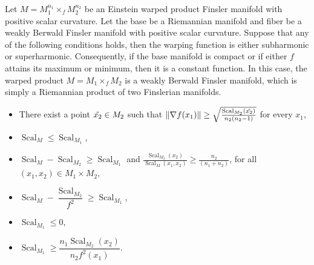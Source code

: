 \documentclass[10pt,a4paper]{amsart}
\begin{document}
\begin{theorem}\label{thm4.2}
	Let $M=M_1^{n_1}\times_{f} M_2^{n_2}$ be an Einstein warped product Finsler manifold with 
 positive scalar curvature. 
 Let the base be a Riemannian manifold and fiber be  a weakly Berwald Finsler manifold with 
positive scalar curvature.
Suppose that 
  any of  the following conditions holds, then the 
  warping function is either subharmonic or superharmonic. Consequently, if the base manifold is compact 
  or if either $f$ attains its maximum or minimum, then
  it is a constant function. In this case,
   the warped product $M=M_1\times_f M_2$ is a weakly Berwald Finsler manifold, which is  simply a Riemannian product of two Finslerian manifolds.
	\begin{itemize}
		\item[\emph{(a)}] There exist a point $\Tilde{x_2}\in M_2$ such that 
  $\|\nabla f(x_1)\|\geq \sqrt{\frac{\operatorname{Scal}_{M_2}(\Tilde{x_2})}{n_2(n_2-1)}}$ for every $x_1$,
		
		\item[\emph{(b)}] $\operatorname{Scal}_M\leq \operatorname{Scal}_{M_1}$,
		
		\item[\emph{(c)}] $\operatorname{Scal}_M-\operatorname{Scal}_{M_2}\geq \operatorname{Scal}_{M_1}$ and $\frac{\operatorname{Scal}_{M_2}(x_2)}{\operatorname{Scal}_{M}(x_1,x_2)}\geq\frac{n_2}{(n_1+n_2)}$, for all $(x_1,x_2)\in M_1\times M_2$,
		
		\item[\emph{(d)}] $\operatorname{Scal}_M-\dfrac{\operatorname{Scal}_{M_2}}{f^2}\geq \operatorname{Scal}_{M_1}$, 
		
		\item[\emph{(e)}] $\operatorname{Scal}_{M_1}\leq 0$,
		
		\item[\emph{(f)}] $\operatorname{Scal}_{M_1}\geq\dfrac{n_1\operatorname{Scal}_{M_2}(x_2)}{n_2f^2(x_1)}$. 
	\end{itemize} 
\end{theorem}	
\end{document}
